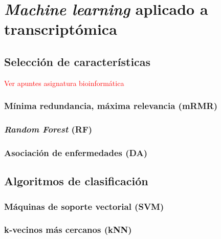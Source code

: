 \chapter{\textit{Machine learning} aplicado a transcriptómica}

\section{Selección de características}

\textcolor{red}{Ver apuntes asignatura bioinformática}

\subsection{Mínima redundancia, máxima relevancia (mRMR)}

\subsection{\textit{Random Forest} (RF)}

\subsection{Asociación de enfermedades (DA)}

\section{Algoritmos de clasificación}

\subsection{Máquinas de soporte vectorial (SVM)}

\subsection{k-vecinos más cercanos (kNN)}


